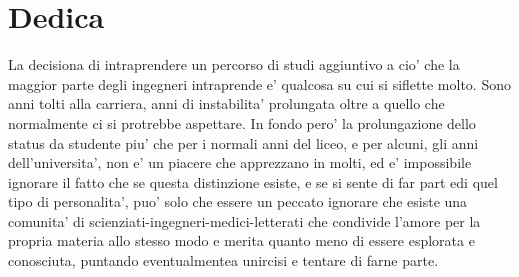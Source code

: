 \documentclass[./dissertation.tex]{subfiles}
\begin{document}
  \chapter*{Dedica}
  La decisiona di intraprendere un percorso di studi aggiuntivo a cio' che la maggior parte degli ingegneri intraprende e' qualcosa su cui si siflette molto. Sono anni tolti alla carriera, anni di instabilita' prolungata oltre a quello che normalmente ci si protrebbe aspettare. In fondo pero' la prolungazione dello status da studente piu' che per i normali anni del liceo, e per alcuni, gli anni dell'universita', non e' un piacere che apprezzano in molti, ed e' impossibile ignorare il fatto che se questa distinzione esiste, e se si sente di far part edi quel tipo di personalita', puo' solo che essere un peccato ignorare che esiste una comunita' di scienziati-ingegneri-medici-letterati che condivide l'amore per la propria materia allo stesso modo e merita quanto meno di essere esplorata e conosciuta, puntando eventualmentea unircisi e tentare di farne parte.




  

 
\end{document}
